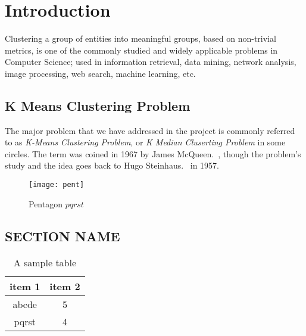 \chapter{Introduction}
Clustering a group of entities into meaningful groups, based on non-trivial metrics, is one of the commonly studied and widely applicable problems in Computer Science; used in information retrieval, data mining, network analysis, image processing, web search, machine learning, etc. 

\section{K Means Clustering Problem}
The major problem that we have addressed in the project is commonly referred to as {\it K-Means Clustering Problem}, or {\it K Median Cluserting Problem} in some circles. The term was coined in 1967 by James McQueen.~\cite{James1}, though the problem's study and the idea goes back to Hugo Steinhaus.~\cite{Hugo1} in 1957. 

\begin{figure}[here]
\begin{center}	
\texttt{[image: pent]} 
\caption{Pentagon $pqrst$}
\label{fig:pent}
\end{center}
\end{figure}

\lipsum[1]

\section{SECTION NAME}
\lipsum[2]

\begin{table}
\centering
\begin{tabular}{| c | c |}
\hline
{\bf item 1} & {\bf item 2} \\ \hline
%
abcde & 5 \\ \hline
%
pqrst & 4 \\ \hline
\end{tabular}
\caption{A sample table}
\label{table:1}
\end{table}
